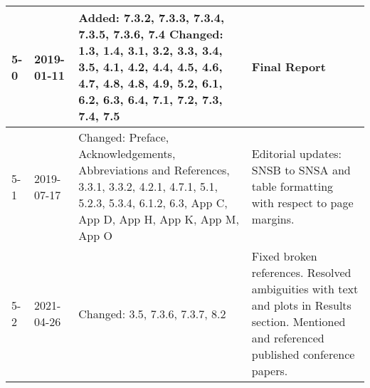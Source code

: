 \begin{longtable}{|p{1.5cm}|p{2cm}|p{6cm}|p{3cm}|}
5-0 & 2019-01-11 & Added: 7.3.2, 7.3.3, 7.3.4, 7.3.5, 7.3.6, 7.4 Changed: 1.3, 1.4, 3.1, 3.2, 3.3, 3.4, 3.5, 4.1, 4.2, 4.4, 4.5, 4.6, 4.7, 4.8, 4.8, 4.9, 5.2, 6.1, 6.2, 6.3, 6.4, 7.1, 7.2, 7.3, 7.4, 7.5  & Final Report \\ \hline
5-1     & 2019-07-17 & Changed: Preface, Acknowledgements, Abbreviations and References, 3.3.1, 3.3.2, 4.2.1, 4.7.1, 5.1, 5.2.3, 5.3.4, 6.1.2, 6.3, App C, App D, App H, App K, App M, App O    & Editorial updates: SNSB to SNSA and table formatting with respect to page margins. \\ \hline
5-2     & 2021-04-26 & Changed: 3.5, 7.3.6, 7.3.7, 8.2 & Fixed broken references. Resolved ambiguities with text and plots in Results section. Mentioned and referenced published conference papers. \\ \hline
\end{longtable}           